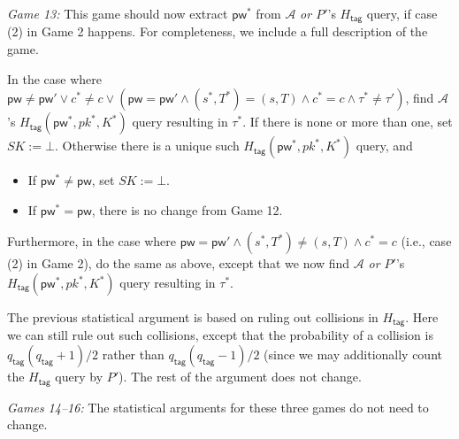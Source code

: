 \documentclass{article}
\theoremstyle{plain}
\theoremstyle{definition}
\theoremstyle{remark}
\newcommand{\adv}{\mathcal{A}}
\newcommand{\Htag}{H_\mathsf{tag}}
\newcommand{\pw}{\mathsf{pw}}
\newcommand{\qtag}{q_\mathsf{tag}}
\begin{document}
\medskip\noindent\emph{Game 13:} This game should now extract $\pw^*$ from $\adv$ {\color{blue}\emph{or $P'$}}'s $\Htag$ query, if case (2) in Game 2 happens. For completeness, we include a full description of the game.

In the case where {\color{blue}$\pw \neq \pw' \lor c^* \neq c \lor (\pw = \pw' \land (s^*,T^*) = (s,T) \land c^* = c \land \tau^* \neq \tau')$}, find $\adv$'s $\Htag(\pw^*,pk^*,K^*)$ query resulting in $\tau^*$. If there is none or more than one, set $SK := \bot$. Otherwise there is a unique such $\Htag(\pw^*,pk^*,K^*)$ query, and
\begin{itemize}
  \item If $\pw^* \neq \pw$, set $SK := \bot$.
  \item If $\pw^* = \pw$, there is no change from Game 12.
\end{itemize}

Furthermore, in the case where $\pw = \pw' \land (s^*,T^*) \neq (s,T) \land c^* = c$ (i.e., case (2) in Game 2), do the same as above, except that we now find $\adv$ {\color{blue}\emph{or $P'$}}'s $\Htag(\pw^*,pk^*,K^*)$ query resulting in $\tau^*$.

The previous statistical argument is based on ruling out collisions in $\Htag$. Here we can still rule out such collisions, except that the probability of a collision is $\qtag(\qtag+1)/2$ rather than $\qtag(\qtag-1)/2$ (since we may additionally count the $\Htag$ query by $P'$). The rest of the argument does not change.

\medskip\noindent\emph{Games 14--16:} The statistical arguments for these three games do not need to change.
\end{document}
